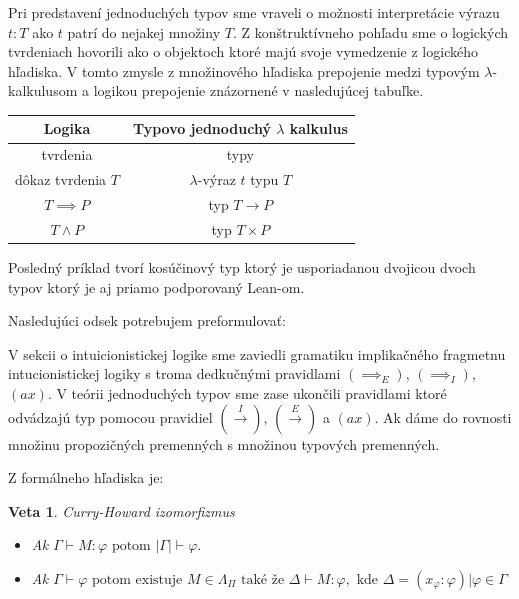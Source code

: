\documentclass[a4paper,10pt,oneside]{report}%
\newtheorem{theorem}{Veta}[chapter]
\begin{document}
    Pri predstavení jednoduchých typov sme vraveli o možnosti interpretácie výrazu
$t : T$ ako $t$ patrí do nejakej množiny $T$.
    Z konštruktívneho pohľadu sme o logických tvrdeniach hovorili ako o objektoch
ktoré majú svoje vymedzenie z logického hľadiska.
    V tomto zmysle z množinového hľadiska prepojenie medzi typovým $\lambda$-kalkulusom
a logikou prepojenie znázornené v nasledujúcej tabuľke.
\begin{center}
    \begin{tabular}{ c c }
        Logika &                Typovo jednoduchý $\lambda$ kalkulus \\
        \hline
        tvrdenia                & typy \\
        dôkaz tvrdenia $T$      & $\lambda$-výraz $t$ typu $T$ \\
        $T \implies P$          & typ $T \to P$ \\
        $T \wedge P$            & typ $T \times P$
    \end{tabular}
\end{center}
    Posledný príklad tvorí kosúčinový typ ktorý je usporiadanou dvojicou dvoch typov
ktorý je aj priamo podporovaný Lean-om.

Nasledujúci odsek potrebujem preformulovať:

    V sekcii o intuicionistickej logike sme zaviedli gramatiku implikačného fragmetnu
intucionistickej logiky s troma dedkučnými pravidlami $(\implies_{E})$,
    $(\implies_{I})$, $(ax)$.
    V teórii jednoduchých typov sme zase ukončili pravidlami ktoré odvádzajú
typ pomocou pravidiel $(\overset{I}{\rightarrow})$, $(\overset{E}{\rightarrow})$ a $(ax)$.
    Ak dáme do rovnosti množinu propozičných premenných s množinou typových premenných.

    Z formálneho hľadiska je:
\begin{theorem}{Curry-Howard izomorfizmus}
    \begin{itemize}
        \item Ak $\Gamma \vdash M : \varphi \textrm{ potom } |\Gamma|  \vdash \varphi.$
        \item Ak $\Gamma \vdash \varphi \textrm{ potom existuje } M \in \Lambda_{\Pi}
            \textrm{ také že } \Delta \vdash M : \varphi, \textrm{ kde }
            \Delta = { ( x_{\varphi} : \varphi ) | \varphi \in \Gamma }$
    \end{itemize}
\end{theorem}
\end{document}

